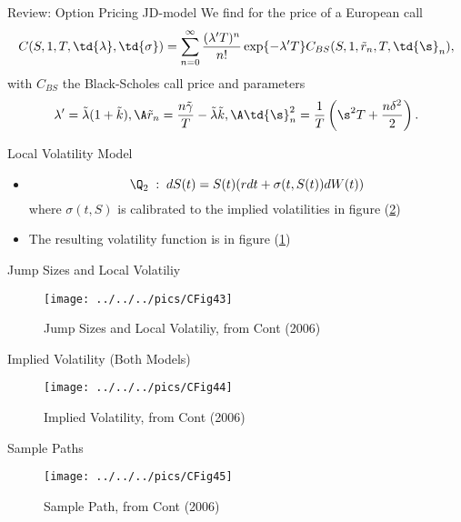 {Review: Option Pricing JD-model}
We find for the price of a European call
$$
C(S, 1, T, \td{\lambda}, \td{\sigma}) = \sum_{n=0}^\infty
\frac{(\lambda' T)^n }{n!} \exp\{-\lambda' T\}
C_{BS}(S,1,\tilde{r}_n,T,\td{\s}_n),
$$
with $C_{BS}$ the Black-Scholes call price and parameters
$$
\lambda'=\tilde{\lambda}(1+\tilde{k}),\A \tilde{r}_n=
\frac{n\tilde{\gamma}}{T}-\tilde{\lambda}\tilde{k},\A \td{\s}_n^2
= \frac{1}{T}\left(\s^2T +\frac{n\delta^2}{2}\right).
$$



{Local Volatility Model}
\begin{itemize}
\item<1->
\begin{equation}\label{Local-Volatility Model}
\Q_2\;:\; dS(t) = S(t)(r dt + \sigma(t, S(t)) dW(t))
\end{equation}
where $ \sigma(t, S)$ is calibrated to the implied volatilities in figure (\ref{CFig44})

\item<2->The resulting volatility function is in figure (\ref{CFig43})
\end{itemize}



{Jump Sizes and Local Volatiliy}
\begin{figure}[htp]
\centering
\texttt{[image: ../../../pics/CFig43]}
\caption{Jump Sizes and Local Volatiliy, from Cont (2006)}\label{CFig43}
\end{figure}



{Implied Volatility (Both Models)}
\begin{figure}[htp]
\centering
\texttt{[image: ../../../pics/CFig44]}
\caption{Implied Volatility, from Cont (2006)}
\label{CFig44}
\end{figure}



{Sample Paths}
\begin{figure}[htp]
\centering
\texttt{[image: ../../../pics/CFig45]}
\caption{Sample Path, from Cont (2006)}\label{CFig45}
\end{figure}





